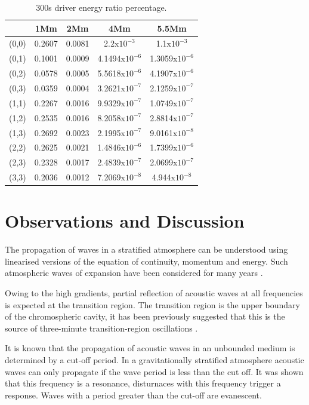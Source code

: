 \documentclass[final,1p]{elsarticle}
\begin{document}
\begin{table}
\centering
\begin{tabular}{c c c c c }
\hline
   &  1Mm & 2Mm & 4Mm & 5.5Mm \\
\hline
(0,0) &  0.2607 & 0.0081 & 2.2x$10^{-3}$ &  1.1x$10^{-3}$\\
\hline
(0,1) & 0.1001 & 0.0009 & 4.1494x$10^{-6}$ &  1.3059x$10^{-6}$\\
\hline
(0,2) & 0.0578 & 0.0005 & 5.5618x$10^{-6}$ &  4.1907x$10^{-6}$\\
\hline
(0,3) & 0.0359 & 0.0004 &3.2621x$10^{-7}$ &  2.1259x$10^{-7}$\\
\hline
(1,1) & 0.2267 & 0.0016 & 9.9329x$10^{-7}$ &  1.0749x$10^{-7}$\\
\hline
(1,2) & 0.2535 & 0.0016 & 8.2058x$10^{-7}$ &  2.8814x$10^{-7}$\\
\hline
(1,3) & 0.2692 & 0.0023 & 2.1995x$10^{-7}$ &  9.0161x$10^{-8}$\\
\hline
(2,2) & 0.2625 & 0.0021 & 1.4846x$10^{-6}$ &  1.7399x$10^{-6}$\\
\hline
(2,3) & 0.2328 & 0.0017 & 2.4839x$10^{-7}$ &  2.0699x$10^{-7}$\\
\hline
(3,3) & 0.2036 & 0.0012 & 7.2069x$10^{-8}$ &  4.944x$10^{-8}$\\
\hline
\end{tabular} 
\caption{ 300s driver energy ratio percentage. }
\end{table}


\section{Observations and Discussion}

The propagation of waves in a stratified atmosphere can be understood using linearised versions of the equation of continuity, momentum and energy. Such atmospheric waves of expansion have been considered for many years \cite{Lamb1932}.

Owing to the high gradients, partial reflection of acoustic waves at all frequencies is expected at the transition region. The transition region is the upper boundary of the chromospheric cavity, it has been previously suggested that this is the source of three-minute transition-region oscillations \cite{Leibacher1971}.

It is known that the propagation of acoustic waves in an unbounded medium is determined by a cut-off period. In a gravitationally stratified atmosphere acoustic waves can only propagate if the wave period is less than the cut off. It was shown that this frequency is a resonance, disturnaces with this frequency trigger a response. Waves with a period greater than the cut-off are evanescent.
\end{document}
